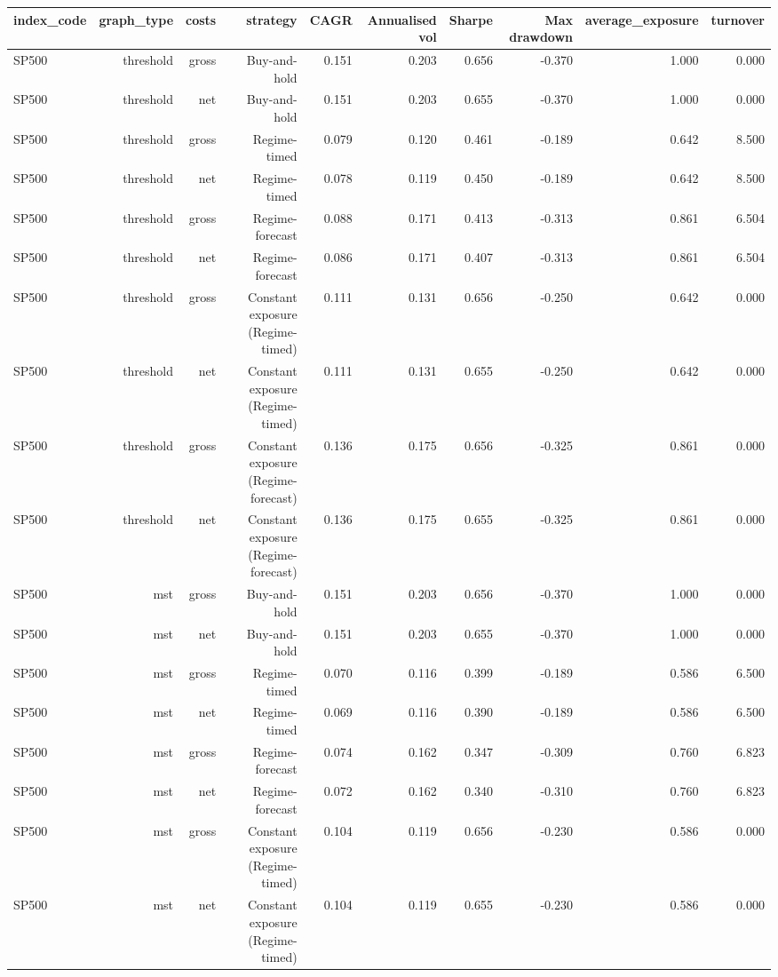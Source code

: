 \begin{tabular}{lrrrrrrrrr}
\toprule
index\_code & graph\_type & costs & strategy & CAGR & Annualised vol & Sharpe & Max drawdown & average\_exposure & turnover \\
\midrule
SP500 & threshold & gross & Buy-and-hold & 0.151 & 0.203 & 0.656 & -0.370 & 1.000 & 0.000 \\
SP500 & threshold & net & Buy-and-hold & 0.151 & 0.203 & 0.655 & -0.370 & 1.000 & 0.000 \\
SP500 & threshold & gross & Regime-timed & 0.079 & 0.120 & 0.461 & -0.189 & 0.642 & 8.500 \\
SP500 & threshold & net & Regime-timed & 0.078 & 0.119 & 0.450 & -0.189 & 0.642 & 8.500 \\
SP500 & threshold & gross & Regime-forecast & 0.088 & 0.171 & 0.413 & -0.313 & 0.861 & 6.504 \\
SP500 & threshold & net & Regime-forecast & 0.086 & 0.171 & 0.407 & -0.313 & 0.861 & 6.504 \\
SP500 & threshold & gross & Constant exposure (Regime-timed) & 0.111 & 0.131 & 0.656 & -0.250 & 0.642 & 0.000 \\
SP500 & threshold & net & Constant exposure (Regime-timed) & 0.111 & 0.131 & 0.655 & -0.250 & 0.642 & 0.000 \\
SP500 & threshold & gross & Constant exposure (Regime-forecast) & 0.136 & 0.175 & 0.656 & -0.325 & 0.861 & 0.000 \\
SP500 & threshold & net & Constant exposure (Regime-forecast) & 0.136 & 0.175 & 0.655 & -0.325 & 0.861 & 0.000 \\
SP500 & mst & gross & Buy-and-hold & 0.151 & 0.203 & 0.656 & -0.370 & 1.000 & 0.000 \\
SP500 & mst & net & Buy-and-hold & 0.151 & 0.203 & 0.655 & -0.370 & 1.000 & 0.000 \\
SP500 & mst & gross & Regime-timed & 0.070 & 0.116 & 0.399 & -0.189 & 0.586 & 6.500 \\
SP500 & mst & net & Regime-timed & 0.069 & 0.116 & 0.390 & -0.189 & 0.586 & 6.500 \\
SP500 & mst & gross & Regime-forecast & 0.074 & 0.162 & 0.347 & -0.309 & 0.760 & 6.823 \\
SP500 & mst & net & Regime-forecast & 0.072 & 0.162 & 0.340 & -0.310 & 0.760 & 6.823 \\
SP500 & mst & gross & Constant exposure (Regime-timed) & 0.104 & 0.119 & 0.656 & -0.230 & 0.586 & 0.000 \\
SP500 & mst & net & Constant exposure (Regime-timed) & 0.104 & 0.119 & 0.655 & -0.230 & 0.586 & 0.000 \\

\end{tabular}
